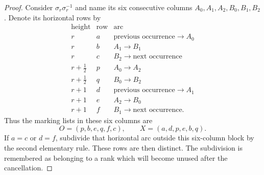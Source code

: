 \documentclass[11pt,a4paper]{article}
\theoremstyle{remark}
\begin{document}
\begin{proof}
Consider $\sigma_r\sigma_r^{-1}$ and name its six consecutive columns
$A_0,A_1,A_2,B_0,B_1,B_2$.  Denote its horizontal rows by
\[
\begin{array}{c|c|c}
\text{height}&\text{row}&\text{arc}\\\hline
r&a&\text{previous occurrence}\to A_0\\
r&b&A_1\to B_1\\
r&c&B_2\to\text{next occurrence}\\
r+\tfrac12&p&A_0\to A_2\\
r+\tfrac12&q&B_0\to B_2\\
r+1&d&\text{previous occurrence}\to A_1\\
r+1&e&A_2\to B_0\\
r+1&f&B_1\to\text{next occurrence}.
\end{array}
\]
Thus the marking lists in these six columns are
\[
 O=(p,b,e,q,f,c),\qquad X=(a,d,p,e,b,q).
\]
If $a=c$ or $d=f$, subdivide that horizontal arc outside this six-column
block by the second elementary rule.  These rows are then distinct.
The subdivision is remembered as belonging to a rank which will become
unused after the cancellation.


\end{proof}
\end{document}
